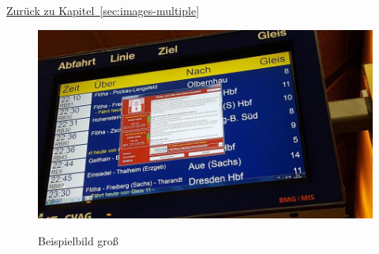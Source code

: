 \hyperref[sec:images-multiple]{Zurück zu Kapitel~\ref{sec:images-multiple}}
\begin{figure}[htb!]
    \centering
    \hspace*{-2.85cm}
    \includegraphics[width=1.3\textwidth]{images/example}\label{fig:big-example}
    \caption{Beispielbild groß}
\end{figure}
